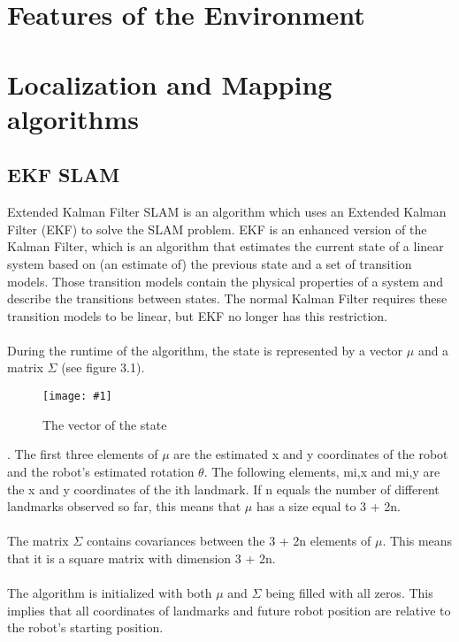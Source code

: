 \documentclass{ba-kecs}
\numberwithin{figure}{section}
\numberwithin{equation}{section}
\newcommand{\dkepic}[2]{ %
	\begin{figure}[H] %
	\texttt{[image: \#1]}
	\caption{#2}
	\label{#1}
	\end{figure}
}
\begin{document}

\section{Features of the Environment}


\section{Localization and Mapping algorithms}

\subsection{EKF SLAM}
Extended Kalman Filter SLAM is an algorithm which uses an Extended Kalman Filter (EKF) to solve the SLAM problem. EKF is an enhanced version of the Kalman Filter, which is an algorithm that estimates the current state of a linear system based on (an estimate of) the previous state and a set of transition models. Those transition models contain the physical properties of a system and describe the transitions between states. The normal Kalman Filter requires these transition models to be linear, but EKF no longer has this restriction.\\ \\
	During the runtime of the algorithm, the state is represented by a vector $\mu$ and a matrix $\Sigma$ (see figure 3.1).\\
\dkepic{bigMatrix}{The vector of the state \cite{vec}}. 
The first three elements of $\mu$ are the estimated x and y coordinates of the robot and the robot’s estimated rotation $\theta$. The following elements, mi,x and mi,y are the x and y coordinates of the ith landmark. If n equals the number of different landmarks observed so far, this means that $\mu$ has a size equal to 3 + 2n.\\\\
The matrix $\Sigma$ contains covariances between the 3 + 2n elements of $\mu$. This means that it is a square matrix with dimension 3 + 2n.\\\\
The algorithm is initialized with both $\mu$ and $\Sigma$ being filled with all zeros. This implies that all coordinates of landmarks and future robot position are relative to the robot’s starting position. \\\\
\end{document}
